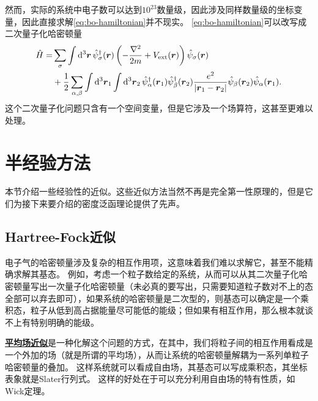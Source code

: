 \documentclass[hyperref, UTF8, a4paper]{ctexart}
\newcommand*{\concept}[1]{\underline{\textbf{#1}}}
\begin{document}
然而，实际的系统中电子数可以达到$10^{23}$数量级，因此涉及同样数量级的坐标变量，因此直接求解\eqref{eq:bo-hamiltonian}并不现实。
\eqref{eq:bo-hamiltonian}可以改写成二次量子化哈密顿量
\begin{equation}
    \begin{aligned}
        \hat{H} = &\sum_{\sigma} \int \dd[3]{\vb*{r}} \hat{\psi}_\sigma^\dagger(\vb*{r}) \left( - \frac{\laplacian}{2m} + V_\text{ext}(\vb*{r}) \right) \hat{\psi}_\sigma(\vb*{r}) \\
        &+ \frac{1}{2} \sum_{\alpha, \beta} \int \dd[3]{\vb*{r}_1} \int \dd[3]{\vb*{r}_2} 
        \hat{\psi}_\alpha^\dagger (\vb*{r}_1) \hat{\psi}_\beta^\dagger (\vb*{r}_2) \frac{e^2}{\abs{\vb*{r}_1 - \vb*{r}_2}} \hat{\psi}_\beta (\vb*{r}_2) \hat{\psi}_\alpha (\vb*{r}_1). 
    \end{aligned}
    \label{eq:bo-second-hamiltonian}
\end{equation}
这个二次量子化问题只含有一个空间变量，但是它涉及一个场算符，这甚至更难以处理。

\section{半经验方法}

本节介绍一些经验性的近似。这些近似方法当然不再是完全第一性原理的，但是它们为接下来要介绍的密度泛函理论提供了先声。

\subsection{Hartree-Fock近似}

电子气的哈密顿量涉及复杂的相互作用项，这意味着我们难以求解它，甚至不能精确求解其基态。
例如，考虑一个粒子数给定的系统，从而可以从其二次量子化哈密顿量写出一次量子化哈密顿量（未必真的要写出，只需要知道粒子数对不上的态全部可以弃去即可），如果系统的哈密顿量是二次型的，则基态可以确定是一个乘积态，粒子从低到高占据能量尽可能低的能级；但如果有相互作用，那么根本就谈不上有特别明确的能级。

\concept{平均场近似}是一种化解这个问题的方式，在其中，我们将粒子间的相互作用看成是一个外加的场（就是所谓的平均场），从而让系统的哈密顿量解耦为一系列单粒子哈密顿量的叠加。
这样系统就可以看成自由场，其基态可以写成乘积态，其坐标表象就是Slater行列式。
这样的好处在于可以充分利用自由场的特有性质，如Wick定理。
\end{document}
